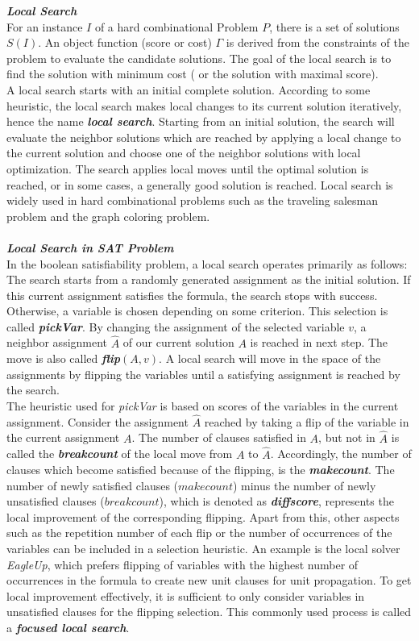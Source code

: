 \documentclass[12pt,a4paper,twoside]{scrartcl}
\numberwithin{equation}{section}
\begin{document}
\emph{\textbf{Local Search}}\\
For an instance $I$ of a hard combinational Problem $P$, there is a set of solutions $S(I)$. An object function (score or cost) $\Gamma$ is derived from the constraints of the problem to evaluate the candidate solutions. The goal of the local search is to find the solution with minimum cost ( or the solution with maximal score).\\
A local search starts with an initial complete solution. According to some heuristic, the local search makes local changes to its current solution iteratively, hence the name \emph{\textbf{local search}}. Starting from an initial solution, the search will evaluate the neighbor solutions which are reached by applying a local change to the current solution and choose one of the neighbor solutions with local optimization. The search applies local moves until the optimal solution is reached, or in some cases, a generally good solution is reached.  Local search is widely used in hard combinational problems such as the traveling salesman problem\cite{johnson1990local} and the graph coloring problem\cite{galinier2006survey}. \\
\\
\emph{\textbf{Local Search in SAT Problem}}\\
In the boolean satisfiability problem, a local search operates primarily as follows: The search starts from a randomly generated assignment as the initial solution. If this current assignment satisfies the formula, the search stops with success. Otherwise, a variable is chosen depending on some criterion. This selection is called \emph{\textbf{pickVar}}. By changing the assignment of the selected variable $v$, a neighbor assignment $\hat{A}$ of our current solution $A$ is reached in next step. The move is also called  \emph{\textbf{flip$(A,v)$}}. A local search will move in the space of the assignments by flipping the variables until a satisfying assignment is reached by the search. \\
The heuristic used for \emph{pickVar}  is based on scores of the variables in the current assignment. Consider the assignment $\hat{A}$  reached by taking a flip of the variable in the current assignment $A$. The number of clauses satisfied in $A$, but not in $\hat{A}$ is called the \emph{\textbf{breakcount}} of the local move from $A$ to $\hat{A}$. Accordingly, the number of clauses which become satisfied because of the flipping, is the  \emph{\textbf{makecount}}. The number of newly satisfied clauses ($makecount$) minus the number of newly unsatisfied clauses ($breakcount$), which is denoted as \emph{\textbf{diffscore}}, represents the local improvement of the corresponding flipping. Apart from this, other aspects such as the repetition number of each flip or the number of occurrences of the variables can be included in a selection heuristic. An example is the local solver \emph{EagleUp}, which prefers flipping of variables with the highest number of occurrences in the formula to create new unit clauses for unit propagation. To get local improvement effectively, it is sufficient to only consider variables in unsatisfied clauses for the flipping selection. This commonly used process is called a \emph{\textbf{focused local search}}. \\
\end{document}
